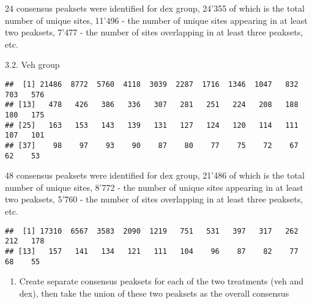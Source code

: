 \documentclass[
]{article}
\newenvironment{Shaded}{\begin{snugshade}}{\end{snugshade}}
\newcommand{\DataTypeTok}[1]{\textcolor[rgb]{0.13,0.29,0.53}{#1}}
\newcommand{\KeywordTok}[1]{\textcolor[rgb]{0.13,0.29,0.53}{\textbf{#1}}}
\newcommand{\NormalTok}[1]{#1}
\newcommand{\OperatorTok}[1]{\textcolor[rgb]{0.81,0.36,0.00}{\textbf{#1}}}
\newcommand{\StringTok}[1]{\textcolor[rgb]{0.31,0.60,0.02}{#1}}
\providecommand{\tightlist}{%
  \setlength{\itemsep}{0pt}\setlength{\parskip}{0pt}}
\begin{document}
24 consensus peaksets were identified for dex group, 24'355 of which is
the total number of unique sites, 11'496 - the number of unique sites
appearing in at least two peaksets, 7'477 - the number of sites
overlapping in at least three peaksets, etc.

3.2. Veh group

\begin{Shaded}
\end{Shaded}

\begin{verbatim}
##  [1] 21486  8772  5760  4118  3039  2287  1716  1346  1047   832   703   576
## [13]   478   426   386   336   307   281   251   224   208   188   180   175
## [25]   163   153   143   139   131   127   124   120   114   111   107   101
## [37]    98    97    93    90    87    80    77    75    72    67    62    53
\end{verbatim}

48 consensus peaksets were identified for dex group, 21'486 of which is
the total number of unique sites, 8'772 - the number of unique sites
appearing in at least two peaksets, 5'760 - the number of sites
overlapping in at least three peaksets, etc.

\begin{Shaded}
\end{Shaded}

\begin{verbatim}
##  [1] 17310  6567  3583  2090  1219   751   531   397   317   262   212   178
## [13]   157   141   134   121   111   104    96    87    82    77    68    55
\end{verbatim}

\begin{enumerate}
\def\labelenumi{\arabic{enumi}.}
\setcounter{enumi}{3}
\tightlist
\item
  Create separate consensus peaksets for each of the two treatments (veh
  and dex), then take the union of these two peaksets as the overall
  consensus
\end{enumerate}
\end{document}

